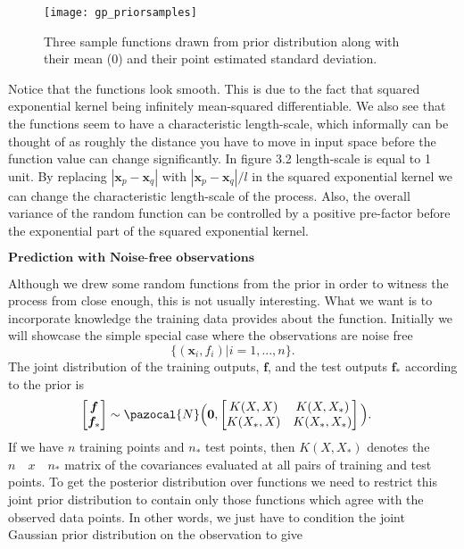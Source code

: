 \documentclass[12pt,a4paper,oneside]{book}
\theoremstyle{plain}
\theoremstyle{definition}
\begin{document}
{\begin{figure}[h]
\begin{center}
\texttt{[image: gp\_priorsamples]}
\caption{Three sample functions drawn from prior distribution along with their mean (0) and their point estimated standard deviation.}
\end{center}
\end{figure}

\vspace{3mm}
\noindent
Notice that the functions look smooth. This is due to the fact that squared exponential kernel being infinitely mean-squared differentiable. We also see that the functions seem to have a characteristic length-scale, which informally can be thought of as roughly the distance you have to move in input space before the function value can change significantly. In figure 3.2 length-scale is equal to 1 unit. By replacing $|\bm{x}_p -\bm{x}_q|$ with $|\bm{x}_p -\bm{x}_q|/l$ in the squared exponential kernel we can change the characteristic length-scale of the process. Also, the overall variance of the random function can be controlled by a positive pre-factor before the exponential part of the squared exponential kernel. 
\vspace{8mm}\newline
\begin{flushleft}
$\textbf{Prediction with Noise-free observations}$
\end{flushleft}
\vspace{3mm}
Although we drew some random functions from the prior in  order to witness the process from close enough, this is not usually interesting. What we want is to incorporate knowledge the training data provides about the function. Initially we will showcase the simple special case where the observations are noise free $$\lbrace (\bm{x}_i,f_i)|i=1,...,n\rbrace.$$ The joint distribution of the training outputs, $\bm{f}$, and the test outputs $\bm{f}_*$ according to the prior is 
\begin{align*}
\begin{bmatrix}
\bm{f} \\
\bm{f}_*
\end{bmatrix}
& \sim \pazocal{N}\Big{(} \bm{0},\begin{bmatrix}
K(X,X) & K(X,X_*) \\
K(X_*,X) & K(X_*,X_*)
\end{bmatrix} \Big{)}.
\end{align*}
If we have $n$ training points and $n_*$ test points, then $K(X,X_*)$ denotes the $n\quad x\quad n_*$ matrix of the covariances evaluated at all pairs of training and test points. To get the posterior distribution over functions we need to restrict this joint prior distribution to contain only those functions which agree with the observed data points. In other words, we just have to condition the joint Gaussian prior distribution on the observation to give 
}
\end{document}
